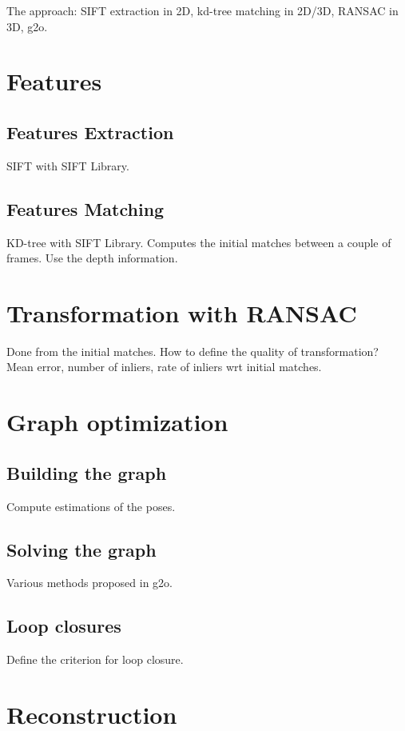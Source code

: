 \documentclass[a4paper,11pt]{kth-mag}
\begin{document}
The approach: SIFT extraction in 2D, kd-tree matching in 2D/3D, RANSAC in 3D, g2o.

\section{Features}
\subsection{Features Extraction}

SIFT with SIFT Library.

\subsection{Features Matching}

KD-tree with SIFT Library.
Computes the initial matches between a couple of frames. Use the depth information.

\section{Transformation with RANSAC}

Done from the initial matches.
How to define the quality of transformation? 
Mean error, number of inliers, rate of inliers wrt initial matches.

\section{Graph optimization}
\subsection{Building the graph}

Compute estimations of the poses.

\subsection{Solving the graph}

Various methods proposed in g2o.

\subsection{Loop closures}

Define the criterion for loop closure.


\section{Reconstruction}
\end{document}
